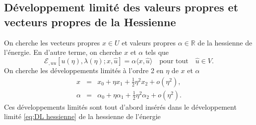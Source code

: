 \documentclass{article}
\newcommand{\nocomma}{}
\begin{document}
\subsection{D{\'e}veloppement limit{\'e} des valeurs propres et vecteurs
propres de la Hessienne}

On cherche les vecteurs propres $x \in U$ et valeurs propres $\alpha \in
\mathbb{R}$ de la hessienne de l'{\'e}nergie. En d'autre terme, on cherche $x$
et $\alpha$ tels que
\begin{equation}
  \mathcal{E}_{, u \nocomma u} [u (\eta), \lambda (\eta) ; x, \hat{u}] =
  \alpha \langle x, \hat{u} \rangle \quad \text{pour tout} \quad \hat{u} \in
  V.
\end{equation}
On cherche les d{\'e}veloppements limit{\'e}s {\`a} l'ordre 2 en $\eta$ de $x$
et $\alpha$
\begin{eqnarray*}
  x & = & x_0 + \eta x_1 + \tfrac{1}{2} \eta^2 x_2 + o (\eta^2),\\
  \alpha & = & \alpha_0 + \eta \alpha_1 + \tfrac{1}{2} \eta^2 \alpha_2 + o
  (\eta^2) .
\end{eqnarray*}
Ces d{\'e}veloppements limit{\'e}s sont tout d'abord ins{\'e}r{\'e}s dans le
d{\'e}veloppement limit{\'e} \eqref{eq:DL hessienne} de la hessienne de
l'{\'e}nergie
\end{document}
